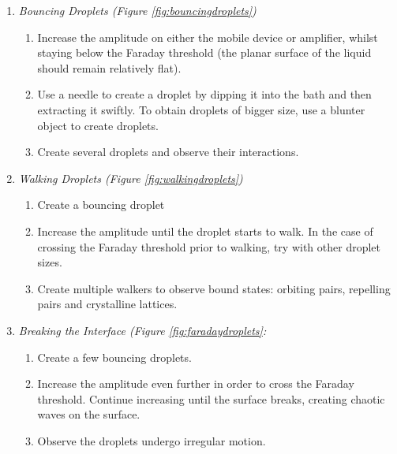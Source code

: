 \begin{enumerate}

\item \textbf{ }\textit{Bouncing Droplets (Figure \ref{fig:bouncingdroplets})}
\begin{enumerate}
\item  Increase the amplitude on either the mobile device or amplifier, whilst staying below the Faraday threshold (the planar surface of the liquid should remain relatively flat).

\item  Use a needle to create a droplet by dipping it into the bath and then extracting it swiftly. To obtain droplets of bigger size, use a blunter object to create droplets.

\item  Create several droplets and observe their interactions.

\end{enumerate}

\noindent 

\item  \textit{Walking Droplets (Figure \ref{fig:walkingdroplets})}
\begin{enumerate}
\item  Create a bouncing droplet 

\item  Increase the amplitude until the droplet starts to walk. In the case of crossing the Faraday threshold prior to walking, try with other droplet sizes.

\item  Create multiple walkers to observe bound states: orbiting pairs, repelling pairs and crystalline lattices.

\end{enumerate}


\item  \textit{Breaking the Interface (Figure \ref{fig:faradaydroplets}:}

\begin{enumerate} 

\item  Create a few bouncing droplets.

\item  Increase the amplitude even further in order to cross the Faraday threshold. Continue increasing until the surface breaks, creating chaotic waves on the surface.

\item  Observe the droplets undergo irregular motion.


\end{enumerate}
\end{enumerate}
